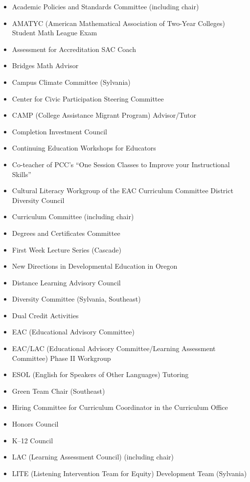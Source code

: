 \begin{itemize}[label={}]
\item Academic Policies and Standards Committee (including chair)
\item AMATYC (American Mathematical Association of Two-Year Colleges) Student Math League Exam
\item Assessment for Accreditation SAC Coach
\item Bridges Math Advisor
\item Campus Climate Committee (Sylvania)
\item Center for Civic Participation Steering Committee
\item CAMP (College Assistance Migrant Program) Advisor/Tutor
\item Completion Investment Council
\item Continuing Education Workshops for Educators
\item Co-teacher of PCC's ``One Session Classes to Improve your Instructional Skills''
\item Cultural Literacy Workgroup of the EAC Curriculum Committee District Diversity Council
\item Curriculum Committee (including chair)
\item Degrees and Certificates Committee
\item First Week Lecture Series (Cascade)
\item New Directions in Developmental Education in Oregon
\item Distance Learning Advisory Council
\item Diversity Committee (Sylvania, Southeast)
\item Dual Credit Activities
\item EAC (Educational Advisory Committee)
\item EAC/LAC (Educational Advisory Committee/Learning Assessment Committee) Phase II Workgroup
\item ESOL (English for Speakers of Other Languages) Tutoring
\item Green Team Chair (Southeast)
\item Hiring Committee for Curriculum Coordinator in the Curriculum Office
\item Honors Council
\item K--12 Council
\item LAC (Learning Assessment Council) (including chair)
\item LITE (Listening Intervention Team for Equity) Development Team (Sylvania)

\end{itemize}
